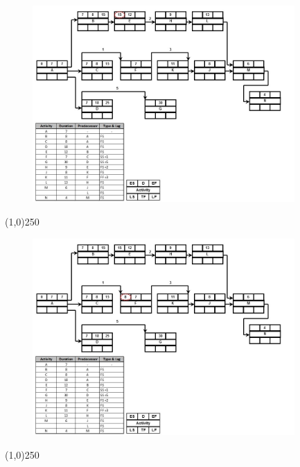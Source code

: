 \begin{frame}
\begin{figure}
	\centering
		\includegraphics[width = 10.0cm]{oldnotes/Slide204.jpg}
\end{figure}
\end{frame}
\begin{center}\line(1,0){250}\end{center}




\begin{frame}
\begin{figure}
	\centering
		\includegraphics[width = 10.0cm]{oldnotes/Slide205.jpg}
\end{figure}
\end{frame}
\begin{center}\line(1,0){250}\end{center}




